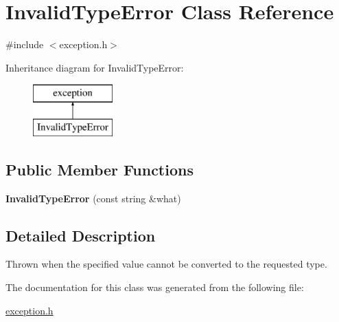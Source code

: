 \hypertarget{class_invalid_type_error}{\section{Invalid\-Type\-Error Class Reference}
\label{class_invalid_type_error}
}


{\ttfamily \#include $<$exception.\-h$>$}

Inheritance diagram for Invalid\-Type\-Error\-:\begin{figure}[H]
\begin{center}
\leavevmode
\includegraphics[height=2.000000cm]{class_invalid_type_error}
\end{center}
\end{figure}
\subsection*{Public Member Functions}
\begin{DoxyCompactItemize}
\item 
\hypertarget{class_invalid_type_error_aaa919293fd756aaa32e33dbed1bcaf7b}{{\bfseries Invalid\-Type\-Error} (const string \&what)}\label{class_invalid_type_error_aaa919293fd756aaa32e33dbed1bcaf7b}

\end{DoxyCompactItemize}


\subsection{Detailed Description}
Thrown when the specified value cannot be converted to the requested type. 

The documentation for this class was generated from the following file\-:\begin{DoxyCompactItemize}
\item 
\hyperlink{exception_8h}{exception.\-h}\end{DoxyCompactItemize}
